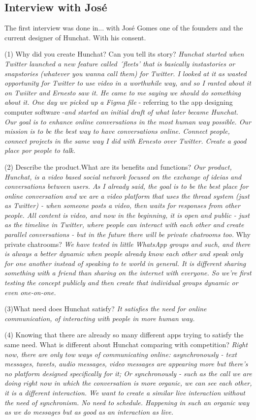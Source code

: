 \documentclass[12pt]{article}
\begin{document}
\subsection {Interview with José} \label{ze}
The first interview was done in... with José Gomes one of the founders and the current designer of Hunchat. With his consent.

(1) Why did you create Hunchat? Can you tell its story? \textit{Hunchat started when Twitter launched a new feature called ´fleets' that is basically instastories or snapstories (whatever you wanna call them) for Twitter. I looked at it as wasted opportunity for Twitter to use video in a worthwhile way, and so I ranted about it on Twiiter and Ernesto saw it. He came to me saying we should do something about it. One day we picked up a Figma file} - referring to the app designing computer software -\textit{and started an initial draft of what later became Hunchat. Our goal is to enhance online conversations in the most human way possible. Our mission is to be the best way to have conversations online. Connect people, connect projects in the same way I did with Ernesto over Twitter. Create a good place por people to talk.} 

(2) Describe the product.What are its benefits and functions? \textit{Our product, Hunchat, is a video based social network focused on the exchange of ideias and conversations between users. As I already said, the goal is to be the best place for online conversation and we are a video platform that uses the thread system (just as Twitter) - when someone posts a video, then waits for responses from other people. All content is video, and now in the beginning, it is open and public - just as the timeline in Twitter, where people can interact with each other and create parallel conversations - but in the future there will be private chatrooms too.} Why private chatrooms? \textit{We have tested in little WhatsApp groups and such, and there is always a better dynamic when people already know each other and speak only for one another instead of speaking to te world in general. It is different sharing something with a friend than sharing on the internet with everyone. So we're first testing the concept publicly and then create that individual groups dynamic or even one-on-one.}

(3)What need does Hunchat satisfy? \textit{It satisfies the need for online communication, of interacting with people in more human way.}

(4) Knowing that there are already so many different apps trying to satisfy the same need. What is different about Hunchat comparing with competition?  \textit{Right now, there are only tow ways of communicating online: asynchronously - text messages, tweets, audio messages, video messages are appearing more but there's no platform designed specifically for it; Or synchronously - such as the call we are doing right now in which the conversation is more organic, we can see each other, it is a different interaction. We want to create a similar live interaction without the need of synchronism. No need to schedule. Happening in such an organic way as we do messages but as good as an interaction as live. } 
\end{document}
